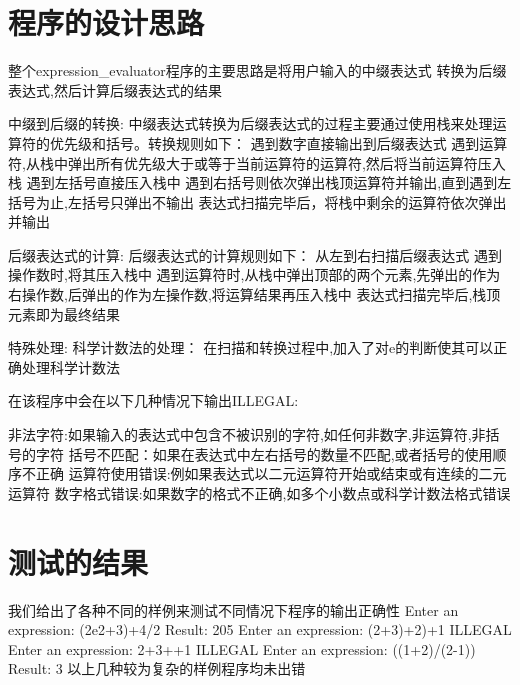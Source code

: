 \documentclass[UTF8]{ctexart}
\begin{document}
\pagestyle{fancy}
\fancyhead{}

\section{程序的设计思路}

整个expression_evaluator程序的主要思路是将用户输入的中缀表达式
转换为后缀表达式,然后计算后缀表达式的结果

中缀到后缀的转换:
中缀表达式转换为后缀表达式的过程主要通过使用栈来处理运算符的优先级和括号。转换规则如下：
遇到数字直接输出到后缀表达式
遇到运算符,从栈中弹出所有优先级大于或等于当前运算符的运算符,然后将当前运算符压入栈
遇到左括号直接压入栈中
遇到右括号则依次弹出栈顶运算符并输出,直到遇到左括号为止,左括号只弹出不输出
表达式扫描完毕后，将栈中剩余的运算符依次弹出并输出

后缀表达式的计算:
后缀表达式的计算规则如下：
从左到右扫描后缀表达式
遇到操作数时,将其压入栈中
遇到运算符时,从栈中弹出顶部的两个元素,先弹出的作为右操作数,后弹出的作为左操作数,将运算结果再压入栈中
表达式扫描完毕后,栈顶元素即为最终结果

特殊处理:
科学计数法的处理：
在扫描和转换过程中,加入了对e的判断使其可以正确处理科学计数法

在该程序中会在以下几种情况下输出ILLEGAL:

非法字符:如果输入的表达式中包含不被识别的字符,如任何非数字,非运算符,非括号的字符
括号不匹配：如果在表达式中左右括号的数量不匹配,或者括号的使用顺序不正确
运算符使用错误:例如果表达式以二元运算符开始或结束或有连续的二元运算符
数字格式错误:如果数字的格式不正确,如多个小数点或科学计数法格式错误

\section{测试的结果}

我们给出了各种不同的样例来测试不同情况下程序的输出正确性
Enter an expression: (2e2+3)+4/2
Result: 205
Enter an expression: (2+3)+2)+1
ILLEGAL
Enter an expression: 2+3++1
ILLEGAL
Enter an expression: ((1+2)/(2-1))
Result: 3
以上几种较为复杂的样例程序均未出错
\end{document}
